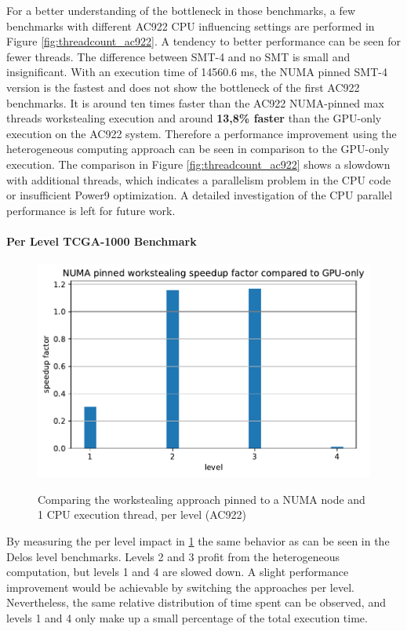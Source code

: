 For a better understanding of the bottleneck in those benchmarks, a few benchmarks with different AC922 CPU influencing settings are performed in Figure \ref{fig:threadcount_ac922}. A tendency to better performance can be seen for fewer threads. The difference between SMT-4 and no SMT is small and insignificant. With an execution time of 14560.6 ms, the NUMA pinned SMT-4 version is the fastest and does not show the bottleneck of the first AC922 benchmarks. It is around ten times faster than the AC922 NUMA-pinned max threads workstealing execution and around \textbf{13,8\% faster} than the GPU-only execution on the AC922 system. Therefore a performance improvement using the heterogeneous computing approach can be seen in comparison to the GPU-only execution. The comparison in Figure \ref{fig:threadcount_ac922} shows a slowdown with additional threads, which indicates a parallelism problem in the CPU code or insufficient Power9 optimization. A detailed investigation of the CPU parallel performance is left for future work.

\paragraph{Per Level TCGA-1000 Benchmark}
\begin{figure}[H]
  \caption{Comparing the workstealing approach pinned to a NUMA node and 1 CPU execution thread, per level (AC922)}
  \includegraphics[width=\textwidth]{figures/ac922_levelwise.pdf}
  \centering
  \label{fig:levelwise_ac922}
\end{figure}

By measuring the per level impact in \ref{fig:levelwise_ac922} the same behavior as can be seen in the Delos level benchmarks. Levels 2 and 3 profit from the heterogeneous computation, but levels 1 and 4 are slowed down. A slight performance improvement would be achievable by switching the approaches per level. Nevertheless, the same relative distribution of time spent can be observed, and levels 1 and 4 only make up a small percentage of the total execution time.

